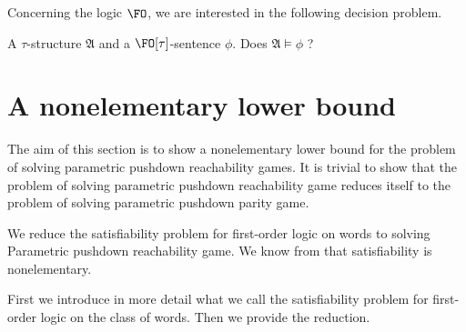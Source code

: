 Concerning the logic $\FO$, we are interested in the following decision problem.

{A $\tau$-structure $\mathfrak{A}$ and a $\FO[\tau]$-sentence $\phi$.}
{Does $\mathfrak{A} \models \phi $ ?\newline}













\section{A nonelementary lower bound}\label{lower bound PDA}



The aim of this section is to show a nonelementary lower bound for the 
problem of solving
parametric pushdown reachability games.
It is trivial to show that
the problem of
solving parametric pushdown reachability game 
reduces itself to
the problem of
solving parametric pushdown parity game.



We reduce the satisfiability problem for first-order logic on words
to solving {\sc Parametric pushdown reachability game}. 
We know from \cite{Sto74}
that satisfiability is nonelementary. 



First we introduce in more detail what we call the satisfiability problem for first-order logic on the class of words.
Then we provide the reduction.








